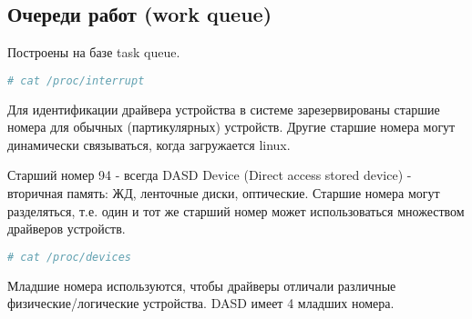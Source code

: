 \subsection{Очереди работ (work queue)}
Построены на базе task queue.

\begin{lstlisting}[language=bash, caption={посмотреть прерывания, доступные в системе}]
# cat /proc/interrupt
\end{lstlisting}

Для идентификации драйвера устройства в системе зарезервированы старшие номера для обычных (партикулярных) устройств. Другие старшие номера могут динамически связываться, когда загружается linux. 

Старший номер 94 - всегда DASD Device (Direct access stored device) - вторичная память: ЖД, ленточные диски, оптические.
Старшие номера могут разделяться, т.е. один и тот же старший номер может использоваться множеством драйверов устройств.

\begin{lstlisting}[language=bash, caption={посмотреть старишие номер в системе}]
# cat /proc/devices
\end{lstlisting}

Младшие номера используются, чтобы драйверы отличали различные физические/логические устройства. DASD имеет 4 младших номера.